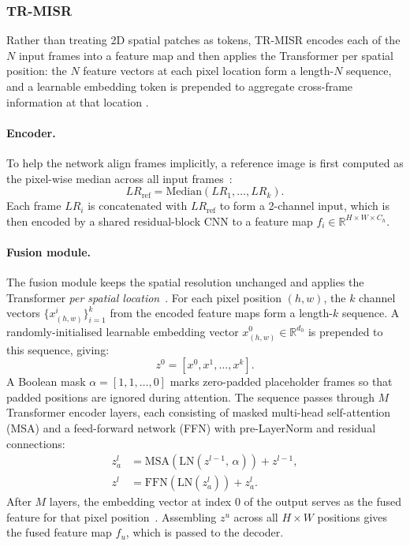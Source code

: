 \subsubsection{TR-MISR}
\label{sssec:trmisr_bg}
Rather than treating 2D spatial patches as tokens, 
TR-MISR encodes each of the $N$ input frames into a feature map and then applies 
the Transformer per spatial position: 
the $N$ feature vectors at each pixel location form a length-$N$ sequence, 
and a learnable embedding token is prepended to aggregate cross-frame information 
at that location \cite{TR-MISR-original}.

\paragraph{Encoder.}
To help the network align frames implicitly, a reference image is first computed as the
pixel-wise median across all input frames~\cite{TR-MISR-original}:
\begin{equation}
  LR_\text{ref} = \mathrm{Median}(LR_1, \ldots, LR_k).
  \label{eq:lrref}
\end{equation}
Each frame $LR_i$ is concatenated with $LR_\text{ref}$ to form a 2-channel input, which is then
encoded by a shared residual-block CNN to a feature map $f_i \in \mathbb{R}^{H \times W \times C_h}$.

\paragraph{Fusion module.}
The fusion module keeps the spatial resolution unchanged and applies the Transformer
\emph{per spatial location}~\cite{TR-MISR-original}.
For each pixel position $(h, w)$, the $k$ channel vectors $\{x^i_{(h,w)}\}_{i=1}^k$ from the
encoded feature maps form a length-$k$ sequence.
A randomly-initialised learnable embedding vector $x^0_{(h,w)} \in \mathbb{R}^{d_0}$ is prepended
to this sequence, giving:
\begin{equation}
  z^0 = [x^0, x^1, \ldots, x^k].
  \label{eq:trmisr_z0}
\end{equation}
A Boolean mask $\alpha = [1, 1, \ldots, 0]$ marks zero-padded placeholder frames so that padded
positions are ignored during attention.
The sequence passes through $M$ Transformer encoder layers, each consisting of masked multi-head
self-attention (MSA) and a feed-forward network (FFN) with pre-LayerNorm and residual connections:
\begin{align}
  z^l_a &= \mathrm{MSA}\!\left(\mathrm{LN}(z^{l-1},\, \alpha)\right) + z^{l-1}, \label{eq:trmisr_msa} \\
  z^l   &= \mathrm{FFN}\!\left(\mathrm{LN}(z^l_a)\right) + z^l_a. \label{eq:trmisr_ffn}
\end{align}
After $M$ layers, the embedding vector at index 0 of the output serves as the fused feature for that 
pixel position~\cite{TR-MISR-original}.
Assembling $z^u$ across all $H \times W$ positions gives the fused feature map $f_u$, which
is passed to the decoder.

